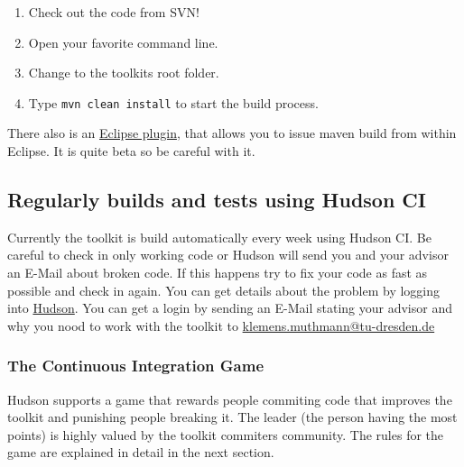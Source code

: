 \documentclass[a4paper,twoside]{article}      %
\begin{document}
\begin{enumerate}
\item Check out the code from SVN!
\item Open your favorite command line.
\item Change to the toolkits root folder.
\item Type \texttt{mvn clean install} to start the build process.
\end{enumerate}
There also is an \href{http://m2eclipse.sonatype.org/}{Eclipse plugin}, that allows you to issue maven build from within Eclipse. It is quite beta so be careful with it.
\subsection{Regularly builds and tests using Hudson CI}
Currently the toolkit is build automatically every week using Hudson CI. Be careful to check in only working code or Hudson will send you and your advisor an E-Mail about broken code. If this happens try to fix your code as fast as possible and check in again. You can get details about the problem by logging into \href{http://www.effingo.de/hudson}{Hudson}. You can get a login by sending an E-Mail stating your advisor and why you nood to work with the toolkit to \href{mailto:klemens.muthmann@tu-dresden.de}{klemens.muthmann@tu-dresden.de}
\subsubsection{The Continuous Integration Game}
Hudson supports a game that rewards people commiting code that improves the toolkit and punishing people breaking it. The leader (the person having the most points) is highly valued by the toolkit commiters community. The rules for the game are explained in detail in the next section.
\end{document}

